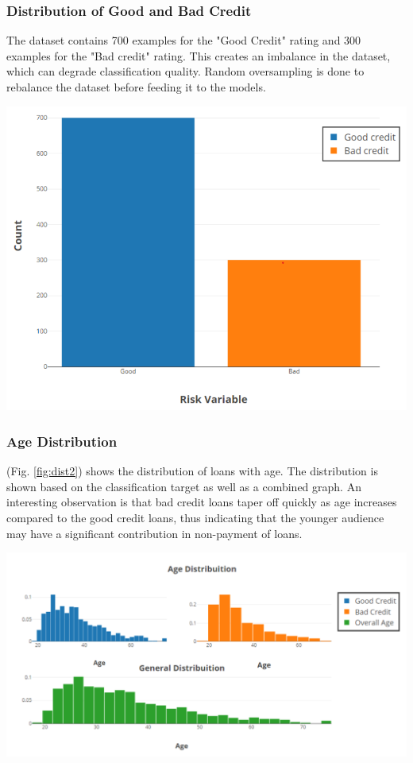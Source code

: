 \documentclass[a4paper, 12pt]{article}
\begin{document}
\subsubsection{Distribution of Good and Bad Credit}
\noindent The dataset contains 700 examples for the "Good Credit" rating and 300 examples for the "Bad credit" rating. This creates an imbalance in the dataset, which can degrade classification quality. Random oversampling is done to rebalance the dataset before feeding it to the models. \cite{japkowicz2002class}


\begin{center}
\includegraphics[scale=0.6]{dist-1.png}
\label{fig:dist1}
\end{center}

\subsubsection{Age Distribution}
\noindent (Fig. \ref{fig:dist2}) shows the distribution of loans with age. The distribution is shown based on the classification target as well as a combined graph. An interesting observation is that bad credit loans taper off quickly as age increases compared to the good credit loans, thus indicating that the younger audience may have a significant contribution in non-payment of loans.

\begin{center}
\includegraphics[scale=0.4]{dist-2.png}
\label{fig:dist2}
\end{center}
\end{document}
